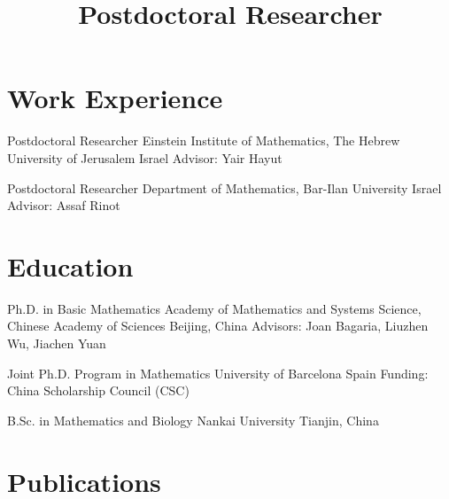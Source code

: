 \documentclass[11pt,a4paper,sans]{moderncv}
\title{Postdoctoral Researcher}
\begin{document}
\makecvtitle

\section{Work Experience}
{Postdoctoral Researcher}
{Einstein Institute of Mathematics, The Hebrew University of Jerusalem}
{Israel}
{Advisor: Yair Hayut}
{}

{Postdoctoral Researcher}
{Department of Mathematics, Bar-Ilan University}
{Israel}
{Advisor: Assaf Rinot}
{}

\section{Education}
{Ph.D. in Basic Mathematics}
{Academy of Mathematics and Systems Science, Chinese Academy of Sciences}
{Beijing, China}
{Advisors: Joan Bagaria, Liuzhen Wu, Jiachen Yuan}
{}

{Joint Ph.D. Program in Mathematics}
{University of Barcelona}
{Spain}
{Funding: China Scholarship Council (CSC)}
{}

{B.Sc. in Mathematics and Biology}
{Nankai University}
{Tianjin, China}
{}
{}

\section{Publications}


\end{document}
